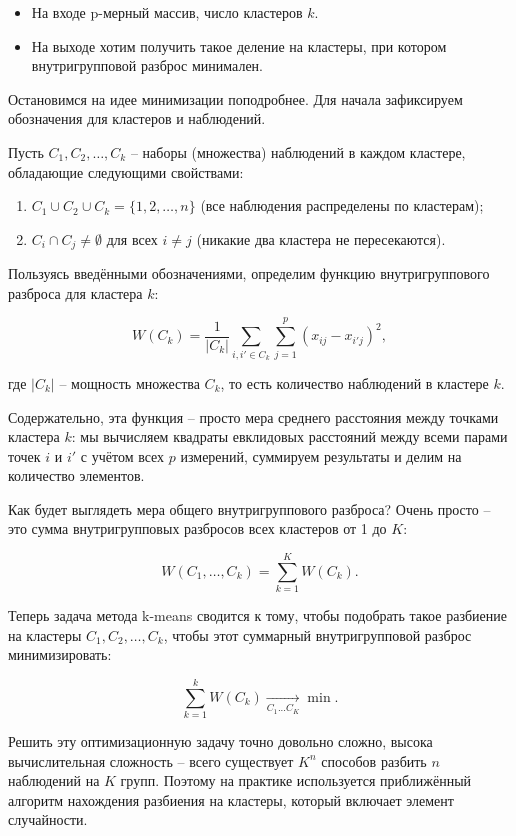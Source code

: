\documentclass[12pt,a4paper]{article}
\theoremstyle{definition}
\begin{document}
\begin{itemize}
\item На входе p-мерный массив, число кластеров $k$.
\item На выходе хотим получить такое деление на кластеры, при котором 
внутригрупповой разброс минимален.
\end{itemize}

Остановимся на идее минимизации поподробнее. Для начала зафиксируем 
обозначения для кластеров и наблюдений.

Пусть $C_1, C_2, \dots, C_k$ -- наборы (множества) наблюдений в каждом 
кластере, обладающие следующими свойствами:

\begin{enumerate}
\item $C_1 \cup C_2 \cup C_k = \{1,2,\dots, n\}$ (все наблюдения распределены по кластерам);
\item $C_i \cap C_j \ne \emptyset$ для всех $i\ne j$ (никакие два кластера не пересекаются).
 \end{enumerate}

Пользуясь введёнными обозначениями, определим
функцию внутригруппового разброса для кластера $k$:

$$
W(C_k)=\dfrac{1}{|C_k|}  \sum_{i, i' \in C_k} \sum^p_{j=1}(x_{ij}-x_{i'j})^2,
$$

где $|C_k|$ – мощность множества $C_k$, то есть количество наблюдений 
в кластере $k$. 

Содержательно, эта функция – просто мера среднего расстояния между точками 
кластера $k$: мы вычисляем квадраты евклидовых расстояний между всеми 
парами точек $i$ и $i'$ с учётом всех $p$ измерений, суммируем результаты и 
делим на количество элементов.

Как будет выглядеть мера общего внутригруппового разброса? 
Очень просто – это сумма внутригрупповых разбросов всех 
кластеров от 1 до $K$:

$$
W(C_1, \dots, C_k) = \sum^K_{k=1} W(C_k).
$$

Теперь задача метода k-means сводится к тому, чтобы подобрать 
такое разбиение на кластеры $C_1, C_2, \dots, C_k$, чтобы этот 
суммарный внутригрупповой разброс минимизировать:

$$
\sum^k_{k=1} W(C_k) \xrightarrow[C_1...C_K]{} \min.
$$

Решить эту оптимизационную задачу точно довольно сложно, высока 
вычислительная сложность – всего существует $K^n$ способов разбить 
$n$ наблюдений на $K$ групп. Поэтому на практике используется 
приближённый алгоритм нахождения разбиения на кластеры, который 
включает элемент случайности.
\end{document}
